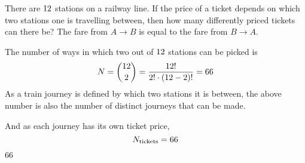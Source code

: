 



\question[4] There are $12$ stations on a railway line. If the price of a ticket depends on 
which two stations one is travelling between, then how many differently priced tickets can there be? 
The fare from $A\to B$ is equal to the fare from $B\to A$.

\watchout

\begin{solution}[\mcq]
  The number of ways in which two out of $12$ stations can be picked is 
  \[ N = \binom{12}{2} = \dfrac{12 !}{2!\cdot (12-2)!} = 66 \]
  As a train journey is defined by which two stations it is between, the above 
  number is also the number of distinct journeys that can be made. 

  And as each journey has its own ticket price, 
  \[ N_{\text{tickets}} = 66 \] 
\end{solution}

\ifprintanswers\begin{codex}$66$\end{codex}\fi
